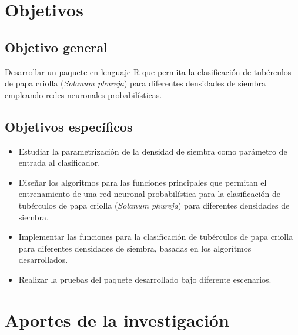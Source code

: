 \section{Objetivos}

\subsection{Objetivo general}

Desarrollar un paquete en lenguaje R que permita la clasificación de tubérculos de papa criolla (\textit{Solanum phureja}) para diferentes densidades de siembra empleando redes neuronales probabilísticas.

\subsection{Objetivos espec\'ificos}
 
\begin{itemize}
\item{Estudiar la parametrizaci\'on de la densidad de siembra como par\'ametro de entrada al clasificador.}
\item{Diseñar los algoritmos para las funciones principales que permitan el entrenamiento de una red neuronal probabilística para la clasificación de tubérculos de papa criolla (\textit{Solanum phureja}) para diferentes densidades de siembra.}
\item{Implementar las funciones  para la clasificación de tubérculos de papa criolla para diferentes densidades de siembra, basadas en los algorítmos desarrollados.}
\item{Realizar la pruebas del paquete desarrollado bajo diferente escenarios.}
\end{itemize}

\section{Aportes de la investigaci\'on}

